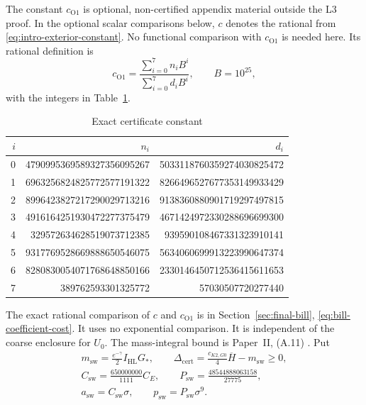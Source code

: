 The constant $c_{\mathrm{O1}}$ is optional, non-certified appendix
material outside the L3 proof.
In the optional scalar comparisons below, $c$ denotes the rational
from \eqref{eq:intro-exterior-constant}.
No functional comparison with $c_{\mathrm{O1}}$ is needed here.
Its rational definition is
\begin{equation}\label{eq:l3-exact-certificate-constant}
 c_{\mathrm{O1}}=\frac{\sum_{i=0}^7n_iB^i}{\sum_{i=0}^7d_iB^i},
 \qquad B=10^{25},
\end{equation}
with the integers in Table~\ref{tab:l3-certificate-integers}.
\begin{table}[ht]
\caption{Exact certificate constant}\label{tab:l3-certificate-integers}
\small
\begin{tabular}{@{}rrr@{}}
\hline
$i$ & $n_i$ & $d_i$\\
\hline
 0 & 4790995369589327356095267 & 5033118760359274030825472\\
 1 & 6963256824825772577191322 & 8266496527677353149933429\\
 2 & 8996423827217290029713216 & 9138360880901719297497815\\
 3 & 4916164251930472277375479 & 4671424972330288696699300\\
 4 & 329572634628519073712385 & 939590108467331323910141\\
 5 & 9317769528669888650546075 & 5634060699913223990647374\\
 6 & 8280830054071768648850166 & 2330146450712536415611653\\
 7 & 389762593301325772 & 57030507720277440\\
\hline
\end{tabular}
\end{table}
The exact rational comparison of $c$ and $c_{\mathrm{O1}}$ is
in Section~\ref{sec:final-bill}, \eqref{eq:bill-coefficient-cost}. It uses no exponential
comparison.
It is independent of the coarse enclosure for $U_0$.
The mass-integral bound is Paper~II, (A.11)
\cite[(A.11)]{PaperII}.
Put
\begin{equation}\label{eq:l3-price}
\begin{gathered}
 m_{\mathrm{sw}}=\frac{e^{-\gamma}}2I_{\mathrm{HL}}G_*,\qquad
 \Delta_{\mathrm{cert}}=\frac{c_{K2,G0}}4\overline H-m_{\mathrm{sw}}\ge0,\\
 C_{\mathrm{sw}}=\frac{650000000}{1111}C_E,\qquad
 P_{\mathrm{sw}}=\frac{48544888063158}{27775},\\
 a_{\mathrm{sw}}=C_{\mathrm{sw}}\sigma,\qquad
 p_{\mathrm{sw}}=P_{\mathrm{sw}}\sigma^9.
\end{gathered}
\end{equation}
